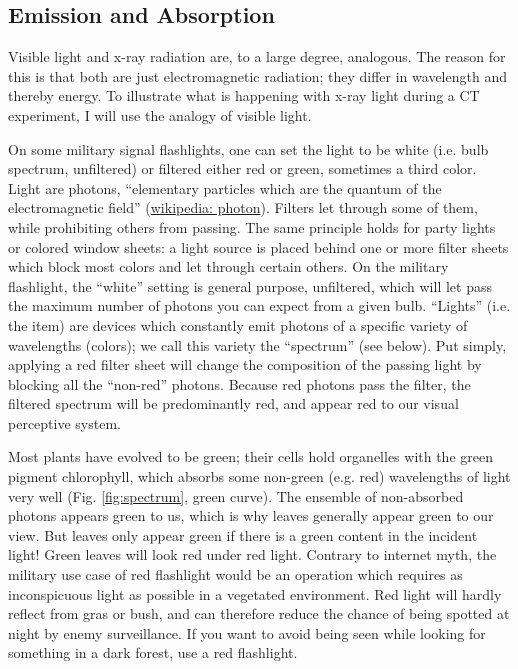 \subsection{Emission and Absorption}
\label{sec:orge8c3674}
Visible light and x-ray radiation are, to a large degree, analogous.
The reason for this is that both are just electromagnetic radiation; they differ in wavelength and thereby energy.
To illustrate what is happening with x-ray light during a CT experiment, I will use the analogy of visible light.


On some military signal flashlights, one can set the light to be white (i.e. bulb spectrum, unfiltered) or filtered either red or green, sometimes a third color.
Light are photons, ``elementary particles which are the quantum of the electromagnetic field'' (\href{https://en.wikipedia.org/wiki/Photon}{wikipedia: photon}).
Filters let through some of them, while prohibiting others from passing.
The same principle holds for party lights or colored window sheets: a light source is placed behind one or more filter sheets which block most colors and let through certain others.
On the military flashlight, the ``white'' setting is general purpose, unfiltered, which will let pass the maximum number of photons you can expect from a given bulb.
``Lights'' (i.e. the item) are devices which constantly emit photons of a specific variety of wavelengths (colors); we call this variety the ``spectrum'' (see below).
Put simply, applying a red filter sheet will change the composition of the passing light by blocking all the ``non-red'' photons.
Because red photons pass the filter, the filtered spectrum will be predominantly red, and appear red to our visual perceptive system.

Most plants have evolved to be green; their cells hold organelles with the green pigment chlorophyll, which absorbs some non-green (e.g. red) wavelengths of light very well (Fig. \ref{fig:spectrum}, green curve).
The ensemble of non-absorbed photons appears green to us, which is why leaves generally appear green to our view.
But leaves only appear green if there is a green content in the incident light!
Green leaves will look red under red light.
Contrary to internet myth, the military use case of red flashlight would be an operation which requires as inconspicuous light as possible in a vegetated environment.
Red light will hardly reflect from gras or bush, and can therefore reduce the chance of being spotted at night by enemy surveillance.
If you want to avoid being seen while looking for something in a dark forest, use a red flashlight.


